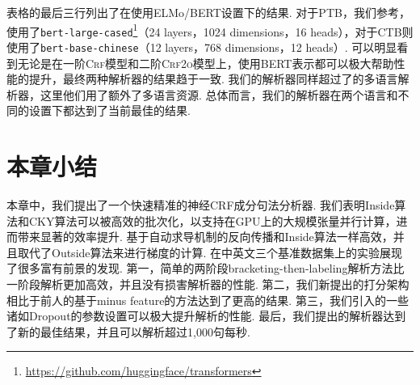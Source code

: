 表格的最后三行列出了在使用ELMo/BERT设置下的结果.
对于PTB，我们参考\citet{kitaev-etal-2019-multilingual}，使用了\texttt{bert-large-cased}\footnote{\url{https://github.com/huggingface/transformers}}（24 layers，1024 dimensions，16 heads），对于CTB则使用了\texttt{bert-base-chinese}（12 layers，768 dimensions，12 heads）.
可以明显看到无论是在一阶\textsc{Crf}模型和二阶\textsc{Crf2o}模型上，使用BERT表示都可以极大帮助性能的提升，最终两种解析器的结果趋于一致.
我们的解析器同样超过了\citet{kitaev-etal-2019-multilingual}的多语言解析器，这里他们用了额外了多语言资源.
总体而言，我们的解析器在两个语言和不同的设置下都达到了当前最佳的结果.

\section{本章小结}\label{sec:con-conclusions}

本章中，我们提出了一个快速精准的神经CRF成分句法分析器.
我们表明Inside算法和CKY算法可以被高效的批次化，以支持在GPU上的大规模张量并行计算，进而带来显著的效率提升.
基于自动求导机制的反向传播和Inside算法一样高效，并且取代了Outside算法来进行梯度的计算.
在中英文三个基准数据集上的实验展现了很多富有前景的发现.
第一，简单的两阶段bracketing-then-labeling解析方法比一阶段解析更加高效，并且没有损害解析器的性能.
第二，我们新提出的打分架构相比于前人的基于minus feature的方法达到了更高的结果.
第三，我们引入的一些诸如Dropout的参数设置可以极大提升解析的性能.
最后，我们提出的解析器达到了新的最佳结果，并且可以解析超过1,000句每秒.
